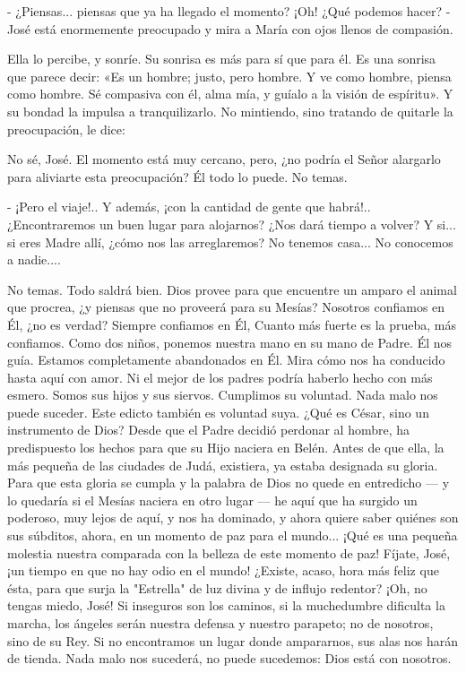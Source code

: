 \documentclass[12pt]{book} %
\begin{document}
- ¿Piensas... piensas que ya ha llegado el momento? ¡Oh! ¿Qué podemos hacer? - José está enormemente preocupado y mira a María con ojos llenos de compasión. 

Ella lo percibe, y sonríe. Su sonrisa es más para sí que para él. Es una sonrisa que parece decir: «Es un hombre; justo, pero hombre. Y ve como hombre, piensa como hombre. Sé compasiva con él, alma mía, y guíalo a la visión de espíritu». Y su bondad la impulsa a tranquilizarlo. No mintiendo, sino tratando de quitarle la preocupación, le dice: 

No sé, José. El momento está muy cercano, pero, ¿no podría el Señor alargarlo para aliviarte esta preocupación? Él todo lo puede. No temas. 

- ¡Pero el viaje!.. Y además, ¡con la cantidad de gente que habrá!.. ¿Encontraremos un buen lugar para alojarnos? ¿Nos dará tiempo a volver? Y si... si eres Madre allí, ¿cómo nos las arreglaremos? No tenemos casa... No conocemos a nadie.... 

No temas. Todo saldrá bien. Dios provee para que encuentre un amparo el animal que procrea, ¿y piensas que no proveerá para su Mesías? Nosotros confiamos en Él, ¿no es verdad? Siempre confiamos en Él, Cuanto más fuerte es la prueba, más confiamos. Como dos niños, ponemos nuestra mano en su mano de Padre. Él nos guía. Estamos completamente abandonados en Él. Mira cómo nos ha conducido hasta aquí con amor. Ni el mejor de los padres podría haberlo hecho con más esmero. Somos sus hijos y sus siervos. Cumplimos su voluntad. Nada malo nos puede suceder. Este edicto también es voluntad suya. ¿Qué es César, sino un instrumento de Dios? Desde que el Padre decidió perdonar al hombre, ha predispuesto los hechos para que su Hijo naciera en Belén. Antes de que ella, la más pequeña de las ciudades de Judá, existiera, ya estaba designada su gloria. Para que esta gloria se cumpla y la palabra de Dios no quede en entredicho — y lo quedaría si el Mesías naciera en otro lugar — he aquí que ha surgido un poderoso, muy lejos de aquí, y nos ha dominado, y ahora quiere saber quiénes son sus súbditos, ahora, en un momento de paz para el mundo... ¡Qué es una pequeña molestia nuestra comparada con la belleza de este momento de paz! Fíjate, José, ¡un tiempo en que no hay odio en el mundo! ¿Existe, acaso, hora más feliz que ésta, para que surja la "Estrella" de luz divina y de influjo redentor? ¡Oh, no tengas miedo, José! Si inseguros son los caminos, si la muchedumbre dificulta la marcha, los ángeles serán nuestra defensa y nuestro parapeto; no de nosotros, sino de su Rey. Si no encontramos un lugar donde ampararnos, sus alas nos harán de tienda. Nada malo nos sucederá, no puede sucedemos: Dios está con nosotros. 
\end{document}
